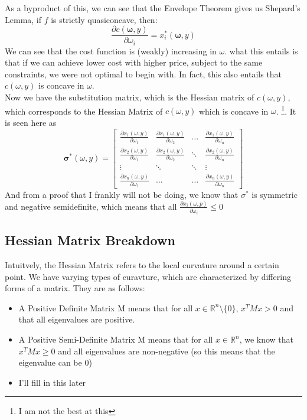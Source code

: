 \documentclass[12pt]{article}
\newcommand{\R}{\mathbb{R}}
\begin{document}
As a byproduct of this, we can see that the Envelope Theorem gives us Shepard's Lemma, if $f$ is strictly quasiconcave, then:
\[
\frac{\partial c(\mathbf{\omega}, y)}{\partial \omega_i} = x_i^*(\mathbf{\omega}, y)
\]
We can see that the cost function is (weakly) increasing in $\omega$. what this entails is that if we can achieve lower cost with higher price, subject to the same constraints, we were not optimal to begin with. In fact, this also entails that $c(\omega, y)$ is concave in $\omega$. \\
Now we have the substitution matrix, which is the Hessian matrix of $c(\omega, y)$, which corresponds to the Hessian Matrix of $c(\omega, y)$ which is concave in $\omega$. \footnote{I am not the best at this}. It is seen here as 
\[
\mathbf{\sigma^*}(\omega, y) = \begin{bmatrix}
    \frac{\partial x_1(\omega, y)}{\partial \omega_1} & \frac{\partial x_1(\omega, y)}{\partial \omega_2} & \dots & \frac{\partial x_1(\omega, y)}{\partial \omega_n} \\
    \frac{\partial x_2(\omega, y)}{\partial \omega_1} & \frac{\partial x_2(\omega, y)}{\partial \omega_2} & \ddots & \frac{\partial x_2(\omega, y)}{\partial \omega_n}\\
    \vdots & \ddots & \ddots & \vdots \\
    \frac{\partial x_n(\omega, y)}{\partial \omega_1} & \dots & \dots & \frac{\partial x_n(\omega, y)}{\partial \omega_n}
\end{bmatrix}
\]
And from a proof that I frankly will not be doing, we know that $\sigma^*$ is symmetric and negative semidefinite, which means that all $\frac{\partial x_i(\omega, p)}{\partial \omega_i} \leq 0$ 
\subsection{Hessian Matrix Breakdown}
Intuitvely, the Hessian Matrix refers to the local curvature around a certain point. We have varying types of curavture, which are characterized by differing forms of a matrix. They are as follows:
\begin{itemize}
    \item A Positive Definite Matrix M means that for all $x \in \R^n \setminus \{0\}$, $x^T M x >0$ and that all eigenvalues are positive.
    \item A Positive Semi-Definite Matrix M means that for all $x \in \R^n$, we know that $x^T M x \geq 0$ and all eigenvalues are non-negative (so this means that the eigenvalue can be 0)
    \item I'll fill in this later 
\end{itemize}
\end{document}
